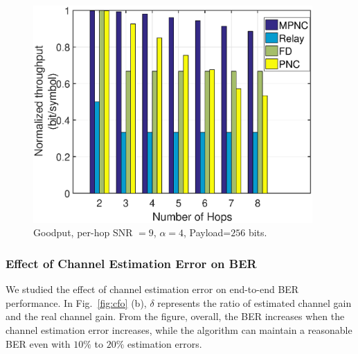 
\begin{figure}
    \centering
    \includegraphics[width=0.95\textwidth]{figures/sim_th_alpha4_snrh2h9BL256}
    \caption{Goodput, per-hop SNR $=9$, $\alpha=4$, Payload=$256$ bits.}
    \label{fig:throughputPNC}
\end{figure}



\subsubsection{Effect of Channel Estimation Error on BER} %
\label{sub:effect_of_channel_estimation}
We studied the effect of channel estimation error %
on end-to-end BER performance. In Fig.~\ref{fig:cfo} (b), $\delta$ represents the ratio of estimated channel gain and the real channel gain. From the figure, 
overall, the BER increases when the channel estimation error increases,  while  the algorithm can maintain a reasonable BER even with $10\%$ to $20\%$
estimation errors. 


